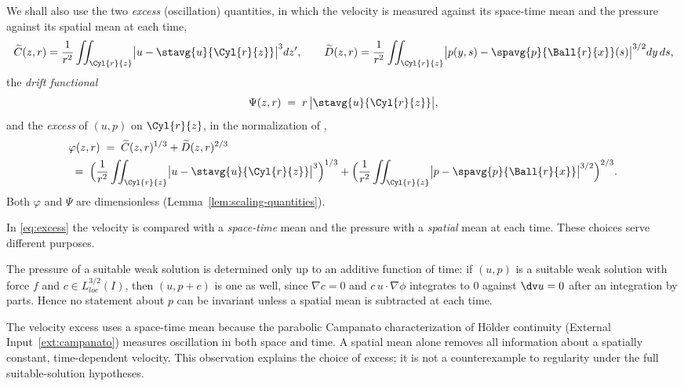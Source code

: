 \documentclass[11pt,reqno]{amsart}
\begin{document}
We shall also use the two \emph{excess} (oscillation) quantities, in which the
velocity is measured against its space-time mean and the pressure against its
spatial mean at each time,
\begin{equation}\label{eq:excess-CD}
  \widetilde C(z,r)
    =\frac1{r^{2}}\iint_{\Cyl{r}{z}}\bigl|u-\stavg{u}{\Cyl{r}{z}}\bigr|^{3}dz',
  \qquad
  \widetilde D(z,r)
    =\frac1{r^{2}}\iint_{\Cyl{r}{z}}
       \bigl|p(y,s)-\spavg{p}{\Ball{r}{x}}(s)\bigr|^{3/2}dy\,ds ,
\end{equation}
the \emph{drift functional}
\begin{equation}\label{eq:drift}
  \Psi(z,r)\;=\;r\,\bigl|\stavg{u}{\Cyl{r}{z}}\bigr| ,
\end{equation}
and the \emph{excess} of $(u,p)$ on $\Cyl{r}{z}$, in the normalization of
\cite[(6.14)]{Tsai2018},
\begin{equation}\label{eq:excess}\begin{aligned}
  &\varphi(z,r)
  \;=\;\widetilde C(z,r)^{1/3}+\widetilde D(z,r)^{2/3}
  \\ &\;=\;\Bigl(\frac1{r^{2}}\iint_{\Cyl{r}{z}}\bigl|u-\stavg{u}{\Cyl{r}{z}}\bigr|^{3}\Bigr)^{1/3}
      +\Bigl(\frac1{r^{2}}\iint_{\Cyl{r}{z}}\bigl|p-\spavg{p}{\Ball{r}{x}}\bigr|^{3/2}\Bigr)^{2/3}.
\end{aligned}\end{equation}
Both $\varphi$ and $\Psi$ are dimensionless
(Lemma~\ref{lem:scaling-quantities}).

\begin{remark}\label{rem:two-means}
In \eqref{eq:excess} the velocity is compared with a \emph{space-time} mean and
the pressure with a \emph{spatial} mean at each time. These choices serve
different purposes.

The pressure of a suitable weak solution is determined only up to an additive
function of time: if $(u,p)$ is a suitable weak solution with force $f$ and
$c\in L^{3/2}_{loc}(I)$, then $(u,p+c)$ is one as well, since $\nabla c=0$ and
$c\,u\cdot\nabla\phi$ integrates to $0$ against $\dv u=0$ after an integration
by parts. Hence no statement about $p$ can be invariant unless a spatial mean is
subtracted at each time.

The velocity excess uses a space-time mean because the parabolic Campanato
characterization of H\"older continuity (External Input~\ref{ext:campanato})
measures oscillation in both space and time. A spatial mean alone removes
all information about a spatially constant, time-dependent velocity. This
observation explains the choice of excess; it is not a counterexample to
regularity under the full suitable-solution hypotheses.
\end{remark}
\end{document}
